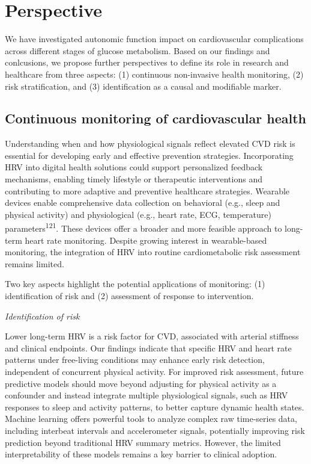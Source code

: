\documentclass[
  a4paper,
  headsepline=true,
  open=any]{scrbook}
\begin{document}

\hypertarget{perspective}{%
\chapter{Perspective}\label{perspective}}

We have investigated autonomic function impact on cardiovascular
complications across different stages of glucose metabolism. Based on
our findings and conlcusions, we propose further perspectives to define
its role in research and healthcare from three aspects: (1) continuous
non-invasive health monitoring, (2) risk stratification, and (3)
identification as a causal and modifiable marker.

\hypertarget{continuous-monitoring-of-cardiovascular-health}{%
\section{Continuous monitoring of cardiovascular
health}\label{continuous-monitoring-of-cardiovascular-health}}

Understanding when and how physiological signals reflect elevated CVD
risk is essential for developing early and effective prevention
strategies. Incorporating HRV into digital health solutions could
support personalized feedback mechanisms, enabling timely lifestyle or
therapeutic interventions and contributing to more adaptive and
preventive healthcare strategies. Wearable devices enable comprehensive
data collection on behavioral (e.g., sleep and physical activity) and
physiological (e.g., heart rate, ECG, temperature)
parameters\textsuperscript{121}. These devices offer a broader and more
feasible approach to long-term heart rate monitoring. Despite growing
interest in wearable-based monitoring, the integration of HRV into
routine cardiometabolic risk assessment remains limited.

Two key aspects highlight the potential applications of monitoring: (1)
identification of risk and (2) assessment of response to intervention.

\emph{Identification of risk}

Lower long-term HRV is a risk factor for CVD, associated with arterial
stiffness and clinical endpoints. Our findings indicate that specific
HRV and heart rate patterns under free-living conditions may enhance
early risk detection, independent of concurrent physical activity. For
improved risk assessment, future predictive models should move beyond
adjusting for physical activity as a confounder and instead integrate
multiple physiological signals, such as HRV responses to sleep and
activity patterns, to better capture dynamic health states. Machine
learning offers powerful tools to analyze complex raw time-series data,
including interbeat intervals and accelerometer signals, potentially
improving risk prediction beyond traditional HRV summary metrics.
However, the limited interpretability of these models remains a key
barrier to clinical adoption.
\end{document}

